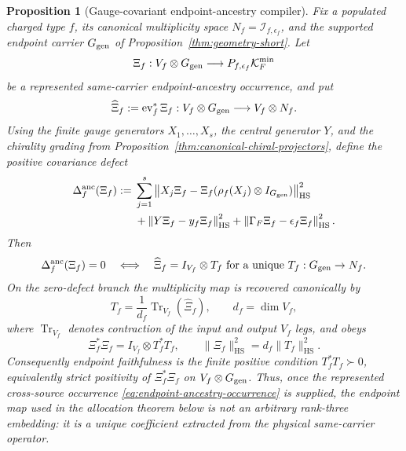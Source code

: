 \documentclass[11pt]{article}
\numberwithin{equation}{section}
\newtheorem{proposition}[theorem]{Proposition}
\theoremstyle{definition}
\theoremstyle{remark}
\newcommand{\Tr}{\operatorname{Tr}}
\newcommand{\HS}{\mathrm{HS}}
\begin{document}
\begin{proposition}[Gauge-covariant endpoint-ancestry compiler]
\label{thm:endpoint-ancestry-compiler}
Fix a populated charged type $f$, its canonical multiplicity space
$N_f=\mathcal I_{f,\epsilon_f}$, and the supported endpoint carrier
$G_{\rm gen}$ of Proposition~\ref{thm:geometry-short}.  Let
\begin{equation}
\Xi_f:V_f\otimes G_{\rm gen}
\longrightarrow P_{f,\epsilon_f}\mathcal K_F^{\min}
\label{eq:endpoint-ancestry-occurrence}
\end{equation}
be a represented same-carrier endpoint-ancestry occurrence, and put
\begin{equation}
\widehat\Xi_f:=\operatorname{ev}_f^*\Xi_f:
V_f\otimes G_{\rm gen}\longrightarrow V_f\otimes N_f.
\label{eq:endpoint-ancestry-evaluation}
\end{equation}
Using the finite gauge generators $X_1,\ldots,X_s$, the central generator
$Y$, and the chirality grading from
Proposition~\ref{thm:canonical-chiral-projectors}, define the positive covariance
defect
\begin{equation}
\begin{aligned}
\Delta_f^{\rm anc}(\Xi_f):={}&
\sum_{j=1}^s
\left\|X_j\Xi_f-
\Xi_f(\rho_f(X_j)\otimes I_{G_{\rm gen}})\right\|_{\HS}^2\\
&+\left\|Y\Xi_f-y_f\Xi_f\right\|_{\HS}^2
 +\left\|\Gamma_F\Xi_f-\epsilon_f\Xi_f\right\|_{\HS}^2.
\end{aligned}
\label{eq:endpoint-ancestry-defect}
\end{equation}
Then
\begin{equation}
\Delta_f^{\rm anc}(\Xi_f)=0
\quad\Longleftrightarrow\quad
\widehat\Xi_f=I_{V_f}\otimes T_f
\text{ for a unique }T_f:G_{\rm gen}\to N_f.
\label{eq:endpoint-ancestry-factorization}
\end{equation}
On the zero-defect branch the multiplicity map is recovered canonically by
\begin{equation}
T_f=\frac1{d_f}\Tr_{V_f}(\widehat\Xi_f),
\qquad d_f=\dim V_f,
\label{eq:endpoint-ancestry-partial-trace}
\end{equation}
where $\Tr_{V_f}$ denotes contraction of the input and output $V_f$ legs,
and obeys
\begin{equation}
\Xi_f^*\Xi_f=I_{V_f}\otimes T_f^*T_f,
\qquad
\|\Xi_f\|_{\HS}^2=d_f\|T_f\|_{\HS}^2.
\label{eq:endpoint-ancestry-Gram}
\end{equation}
Consequently endpoint faithfulness is the finite positive condition
$T_f^*T_f\succ0$, equivalently strict positivity of
$\Xi_f^*\Xi_f$ on $V_f\otimes G_{\rm gen}$.  Thus, once the represented
cross-source occurrence \eqref{eq:endpoint-ancestry-occurrence} is supplied,
the endpoint map used in the allocation theorem below is not an arbitrary
rank-three embedding: it is a unique coefficient extracted from the physical
same-carrier operator.
\end{proposition}
\end{document}
